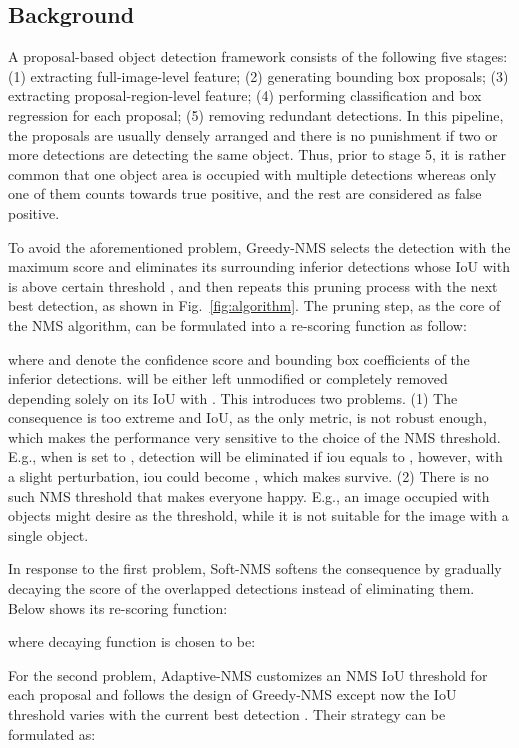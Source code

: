 \documentclass[sigconf]{acmart}
\begin{document}
\subsection{Background} 
\label{sec:background}
A proposal-based object detection framework consists of the following five stages: (1) extracting full-image-level feature; (2) generating bounding box proposals; (3) extracting proposal-region-level feature; (4) performing classification and box regression for each proposal; (5) removing redundant detections. In this pipeline, the proposals are usually densely arranged and there is no punishment if two or more detections are detecting the same object. Thus, prior to stage 5, it is rather common that one object area is occupied with multiple detections whereas only one of them counts towards true positive, and the rest are considered as false positive. 

To avoid the aforementioned problem, Greedy-NMS selects the detection with the maximum score  and eliminates its surrounding inferior detections whose IoU with  is above certain threshold , and then repeats this pruning process with the next best detection, as shown in Fig.~\ref{fig:algorithm}. The pruning step, as the core of the NMS algorithm, can be formulated into a re-scoring function as follow:
 

where  and  denote the confidence score and bounding box coefficients of the inferior detections.  will be either left unmodified or completely removed depending solely on its IoU with . This introduces two problems. (1) The consequence is too extreme and IoU, as the only metric, is not robust enough, which makes the performance very sensitive to the choice of the NMS threshold. E.g., when  is set to , detection  will be eliminated if iou equals to , however, with a slight perturbation, iou could become , which makes  survive. (2) There is no such NMS threshold that makes everyone happy. E.g., an image occupied with  objects might desire  as the threshold, while it is not suitable for the image with a single object.

In response to the first problem, Soft-NMS softens the consequence by gradually decaying the score of the overlapped detections instead of eliminating them. Below shows its re-scoring function:
 
where decaying function  is chosen to be:
 
For the second problem, Adaptive-NMS customizes an NMS IoU threshold for each proposal and follows the design of Greedy-NMS except now the IoU threshold  varies with the current best detection . Their strategy can be formulated as:
 
\end{document}
